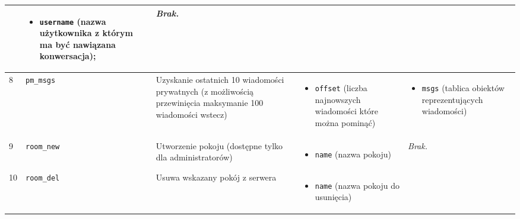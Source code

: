 {\begin{longtable}{ | l | l | l | l | l | }
{} & \parbox{3.9cm}{
	\begin{itemize}
		\item \texttt{username} (nazwa użytkownika z którym ma być nawiązana konwersacja);
	\end{itemize}


} & \parbox{3.9cm}{
	\textit{Brak.}

} \\

\hline
\parbox[t]{0.8cm}{
	8

} & \parbox[t]{1.7cm}{\strut
	\texttt{pm\_msgs}

\strut} & \parbox{4.1cm}{
	Uzyskanie ostatnich 10 wiadomości prywatnych (z możliwością przewinięcia maksymanie 100 wiadomości wstecz)

} & \parbox{3.9cm}{
	\begin{itemize}
		\item \texttt{offset} (liczba najnowszych wiadomości które można pominąć)
	\end{itemize}


} & \parbox{3.9cm}{
	\begin{itemize}
		\item \texttt{msgs} (tablica obiektów reprezentujących wiadomości)
	\end{itemize}
} \\

\hline

\parbox[t]{0.8cm}{
	9

} & \parbox[t]{1.7cm}{\strut
	\texttt{room\_new}

\strut} & \parbox{4.1cm}{
	Utworzenie pokoju (dostępne tylko dla administratorów)

} & \parbox{3.9cm}{
	\begin{itemize}
		\item \texttt{name} (nazwa pokoju)
	\end{itemize}


} & \parbox{3.9cm}{
	\textit{Brak.}
} \\

\hline

\parbox[t]{0.8cm}{
	10

} & \parbox[t]{1.7cm}{\strut
	\texttt{room\_del}

\strut} & \parbox{4.1cm}{
	Usuwa wskazany pokój z serwera

} & \parbox{3.9cm}{
	\begin{itemize}
		\item \texttt{name} (nazwa pokoju do usunięcia)
	\end{itemize}


}
\end{longtable}}
